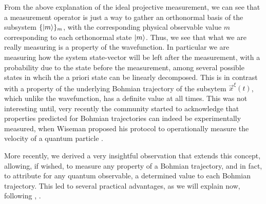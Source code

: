 \documentclass[11pt, a4paper]{article} %
\begin{document}
From the above explanation of the ideal projective measurement, we can see that a measurement operator is just a way to gather an orthonormal basis of the subsystem $\{\ket{m}\}_m$, with the corresponding physical observable value $m$ corresponding to each orthonormal state $\ket{m}$. Thus, we see that what we are really measuring is a property of the wavefunction. In particular we are measuring how the system state-vector will be left after the measurement, with a probability due to the state before the measurement, among several possible states in whcih the a priori state can be linearly decomposed. This is in contrast with a property of the underlying Bohmian trajectory of the subsytem $\vec{x}^\xi(t)$, which unlike the wavefunction, has a definite value at all times. This was not interesting until, very recently the community started to acknowledge that properties predicted for Bohmian trajectories can indeed be experimentally measured, when Wiseman proposed his protocol to operationally measure the velocity of a quantum particle \cite{WisemanVel}.

More recently, we derived a very insightful observation that extends this concept, allowing, if wished, to measure any property of a Bohmian trajectory, and in fact, to attribute for any quantum observable, a determined value to each Bohmian trajectory. This led to several practical advantages, as we will explain now, following \cite{DevInPosition1},  \cite{DevInPosition2}.
\end{document}
